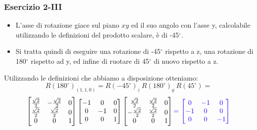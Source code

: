 \documentclass{beamer}
\begin{document}
\begin{frame}
\frametitle{Esercizio 2-III}
\begin{itemize}
\item L'asse di rotazione giace sul piano $xy$ ed il suo angolo con l'asse y,
calcolabile utilizzando le definizioni del prodotto scalare, \`e di
-45$^\circ$.  
\item Si tratta quindi di eseguire una rotazione di -45$^\circ$ rispetto a z,
una rotazione di 180$^\circ$ rispetto ad y, ed infine di ruotare di 45$^\circ$ di nuovo
rispetto a z.  
\end{itemize}
Utilizzando le definizioni che abbiamo a disposizione otteniamo:
%
\begin{displaymath}
R(180^\circ)_{(1,1,0)}= R(-45^\circ)_z~R(180^\circ)_y~R(45^\circ)=
\end{displaymath}
\begin{displaymath}
\begin{bmatrix}
\frac{\sqrt{2}}{2}  & -\frac{\sqrt{2}}{2} & 0 \\
\frac{\sqrt{2}}{2} &  \frac{\sqrt{2}}{2}& 0 \\ 
0  &  0 & 1 
\end{bmatrix}
\begin{bmatrix}
-1  & 0   & 0 \\
0   & -1  & 0 \\ 
0   &  0  & 1 
\end{bmatrix}
\begin{bmatrix}
\frac{\sqrt{2}}{2}  & \frac{\sqrt{2}}{2} & 0 \\
-\frac{\sqrt{2}}{2} &  \frac{\sqrt{2}}{2}& 0 \\ 
0  &  0 & 1 
\end{bmatrix}
{\color[rgb]{0.1,0,1}
=
\begin{bmatrix}
0  & -1 & 0 \\
-1 &  0 & 0 \\ 
0  &  0 & -1 
\end{bmatrix}
}
\end{displaymath}
\end{frame}
\end{document}
